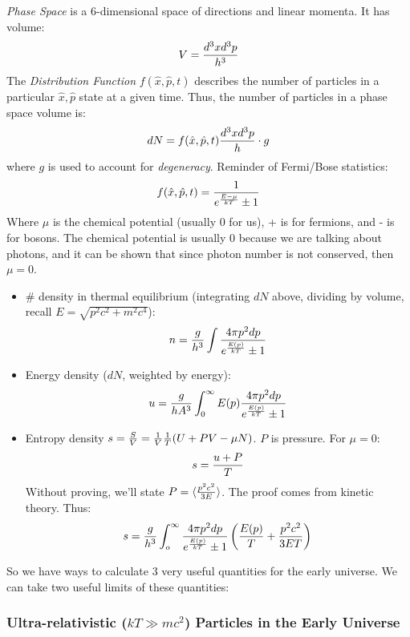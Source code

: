 \documentclass{article}
\def\inv#1{\frac{1}{ #1}}
\begin{document}
{\it Phase Space} is a 6-dimensional space of directions and linear momenta.
It has volume:
$$V = {d^3xd^3p\over h^3}$$
The {\it Distribution Function} $f(\hat x,\hat p,t)$ describes the number of particles
in a particular $\hat x, \hat p$ state at a given time.  Thus, the number of particles
in a phase space volume is:
\def\fxpt{f(\hat x,\hat p,t)}
$$dN=f(\hat x,\hat p,t){d^3xd^3p\over h}\cdot g$$
where $g$ is used to account for {\it degeneracy}.
Reminder of Fermi/Bose statistics:
\def\eeukt{e^{E-\mu\over kT}}
$$\fxpt = \inv{\eeukt\pm 1}$$
Where $\mu$ is the chemical potential (usually 0 for us), + is for fermions,
and - is for bosons.  The chemical potential is usually 0 because we are talking
about photons, and it can be shown that since photon number is not conserved,
then $\mu = 0$.  
\begin{itemize}
\item \# density in thermal equilibrium (integrating $dN$ above, dividing
by volume, recall $E=\sqrt{p^2c^2+m^2c^4}$):
$$n = {g\over h^3}\int{4\pi p^2dp\over e^{E(p)\over kT}\pm 1}$$
\item Energy density ($dN$, weighted by energy):
$$u={g\over hA^3}\int_0^\infty{E(p){4\pi p^2dp\over e^{E(p)\over kT}\pm 1}}$$
\item Entropy density $s={S\over V}=\inv{V}\inv{T}(U+PV-\mu N)$.  $P$ is
pressure. For $\mu=0$:
$$s={u+P\over T}$$
Without proving, we'll state $P=\langle{p^2c^2\over 3E}\rangle$.  
The proof comes from
kinetic theory.  Thus:
\def\epkt{e^{E(p)\over kT}}
$$s={g\over h^3}\int_o^\infty{{4\pi p^2dp\over\epkt\pm 1}\left({E(p)\over T}
+{p^2c^2\over 3ET}\right)}$$
\end{itemize}
So we have ways to calculate 3 very useful quantities for the early universe.  
We can take two useful limits of these quantities:

\subsubsection*{ Ultra-relativistic ($kT\gg mc^2$) Particles in the Early Universe }
\end{document}
